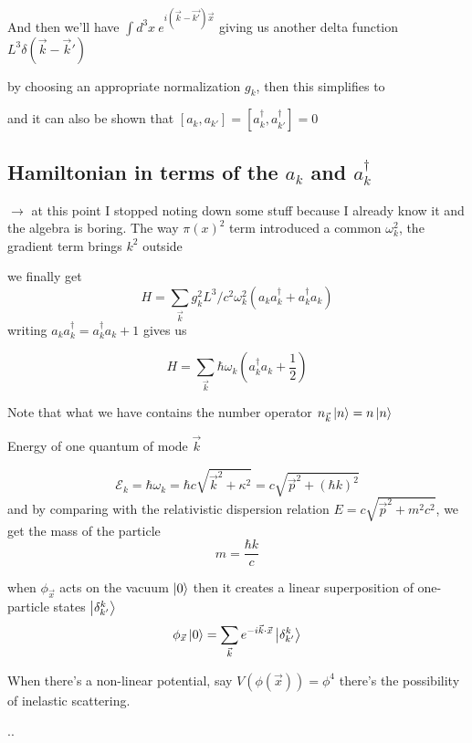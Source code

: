 \documentclass[11pt]{article}
\begin{document}
			And then we'll have $\int d^3 x\ e^{i(\vec{k} -\vec{k'})\vec{x}}$ giving us another delta function $L^3 \delta(\vec{k} - \vec{k}')$
			
			by choosing an appropriate normalization $g_k$, then this simplifies to \begin{center}
			\end{center}
			
			and it can also be shown that $ [a_k, a_{k'}] = [a_k^\dagger, a_{k'}^\dagger] = 0$ 
			
			\subsection*{Hamiltonian in terms of the $a_k$ and $a_k^\dagger$}
			
			$\rightarrow$ at this point I stopped noting down some stuff because I already know it and the algebra is boring. The way $\pi(x)^2$ term introduced a common $\omega_k^2$, the gradient term brings $k^2$ outside
			
			we finally get \[ H = \sum_{\vec{k}} g_k^2L^3/c^2 \omega_k^2 \left( a_ka_k^\dagger + a_k^\dagger a_k\right)\] writing $a_k a_k^\dagger = a_k^\dagger a_k + 1$ gives us
			
			\[ H = \sum_{\vec{k}} \hbar \omega_k (a_k^\dagger a_k + \frac{1}{2})\]
			
			Note that what we have contains the number operator $n_{\vec{k}}\ket{n} = n \ket{n}$
	
			Energy of one quantum of mode $\vec{k}$
		
			\[ \mathcal{E}_k = \hbar \omega_k = \hbar c \sqrt{\vec{k}^2 + \kappa^2} = c\sqrt{\vec{p}^2 + (\hbar k)^2}\]
			and by comparing with the relativistic dispersion relation $E = c\sqrt{\vec{p}^2 + m^2 c^2}$, we get the mass of the particle \[ m = \frac{\hbar k}{c}\]
			
			
			
			when $\phi_{\vec{x}}$ acts on the vacuum $\ket{0}$ then it creates a linear superposition of one-particle states $\ket{\delta^k_{k'}}$
			\[\phi_{\vec{x}} \ket{0} = \sum_{\vec{k}} e^{-i\vec{k}\cdot \vec{x}} \ket{\delta^k_{k'}} \]
			
			When there's a non-linear potential, say $V(\phi(\vec{x})) = \phi^4 $ there's the possibility of inelastic scattering.
			
			..\\
			
			
			
\end{document}
